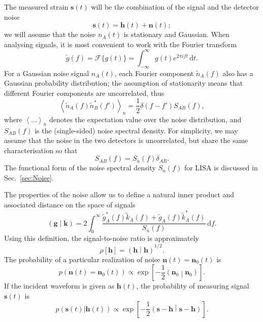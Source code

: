 \documentclass[useAMS,usedcolumn,usegraphicx,usenatbib]{mn2e}
\newcommand{\secref}[1]{Sec.~\ref{sec:#1}}
\newcommand{\dd}{\ensuremath{\mathrm{d}}}
\newcommand{\intd}[4]{\ensuremath{\int_{#1}^{#2}{#3}\,\dd{#4}}}
\newcommand{\recip}[1]{\ensuremath{\frac{1}{#1}}}
\newcommand{\innerprod}[2]{\ensuremath{\left({#1}\middle|{#2}\right)}}
\begin{document}
The measured strain $\boldsymbol{s}(t)$ will be the combination of the signal and the detector noise
\begin{equation}
\boldsymbol{s}(t) = \boldsymbol{h}(t) + \boldsymbol{n}(t);
\end{equation}
we will assume that the noise $n_A(t)$ is stationary and Gaussian. When analysing signals, it is most convenient to work with the Fourier transform
\begin{equation}
\tilde{g}(f) = \mathscr{F}\{g(t)\} = \intd{-\infty}{\infty}{g(t)e^{2\pi i ft}}{t}.
\end{equation}
For a Gaussian noise signal $n_A(t)$, each Fourier component $\tilde{n}_A(f)$ also has a Gaussian probability distribution; the assumption of stationarity means that different Fourier components are uncorrelated, thus \citep{Cutler1994}
\begin{equation}
\left\langle\tilde{n}_A(f)\tilde{n}_B^*(f')\right\rangle_n = \recip{2}\delta(f - f')S_{AB}(f),
\end{equation}
where $\left\langle\ldots\right\rangle_n$ denotes the expectation value over the noise distribution, and $S_{AB}(f)$ is the (single-sided) noise spectral density. For simplicity, we may assume that the noise in the two detectors is uncorrelated, but share the same characterisation so that \citep{Cutler1998}
\begin{equation}
S_{AB}(f) = S_n(f)\delta_{AB}.
\end{equation}
The functional form of the noise spectral density $S_n(f)$ for LISA is discussed in \secref{Noise}.

The properties of the noise allow us to define a natural inner product and associated distance on the space of signals \citep{Cutler1994}
\begin{equation}
\innerprod{\boldsymbol{g}}{\boldsymbol{k}} = 2\intd{0}{\infty}{\frac{\tilde{g}_A^*(f)\tilde{k}_A(f) + \tilde{g}_A(f)\tilde{k}_A^*(f)}{S_n(f)}}{f}.
\label{eq:inner}
\end{equation}
Using this definition, the signal-to-noise ratio is approximately
\begin{equation}
\rho[\boldsymbol{h}] = \innerprod{\boldsymbol{h}}{\boldsymbol{h}}^{1/2}.
\label{eq:SNR}
\end{equation}
The probability of a particular realization of noise $\boldsymbol{n}(t) = \boldsymbol{n}_0(t)$ is
\begin{equation}
p(\boldsymbol{n}(t) = \boldsymbol{n}_0(t)) \propto \exp\left[-\recip{2}\innerprod{\boldsymbol{n}_0}{\boldsymbol{n}_0}\right].
\end{equation}
If the incident waveform is given as $\boldsymbol{h}(t)$, the probability of measuring signal $\boldsymbol{s}(t)$ is
\begin{equation}
p(\boldsymbol{s}(t)|\boldsymbol{h}(t)) \propto \exp\left[-\recip{2}\innerprod{\boldsymbol{s}-\boldsymbol{h}}{\boldsymbol{s}-\boldsymbol{h}}\right].
\label{eq:sig_prob}
\end{equation}
\end{document}
